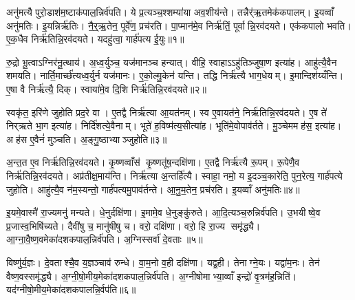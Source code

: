 



\clearpage
{}
\setcounter{anuvakam}{0}
अनु॑मत्यै पुरो॒डाश॑म॒ष्टाक॑पाल॒न्निर्व॑पति। ये प्र॒त्यञ्च॒श्शम्या॑या अव॒शीय॑न्ते। तन्नैर्॑ऋ॒तमेक॑कपालम्। इ॒यव्वाँ अनु॑मतिः। इ॒यन्निर्\mbox{}ऋ॑तिः। नै॒र्॒ऋ॒तेन॒ पूर्वे॑ण॒ प्रच॑रति। पा॒प्मान॑मे॒व निर्\mbox{}ऋ॑तिं॒ पूर्वान्नि॒रव॑दयते। एक॑कपालो भवति। ए॒क॒धैव निर्\mbox{}ऋ॑तिन्नि॒रव॑दयते। यदहु॑त्वा॒ गार्\mbox{}ह॑पत्य ई॒युः॥१॥

रु॒द्रो भू॒त्वाऽग्निर॑नू॒त्थाय॑। अ॒ध्व॒र्युञ्च॒ यज॑मानञ्च हन्यात्। वीहि॒ स्वाहाऽऽहु॑तिञ्जुषा॒ण इत्या॑ह। आहु॑त्यै॒वैन शमयति। नार्ति॒मार्च्छ॑त्यध्व॒र्युर्न यज॑मानः। ए॒को॒ल्मु॒केन॑ यन्ति। तद्धि निर्\mbox{}ऋ॑त्यै भाग॒धेयम्। इ॒मान्दिश॑य्यँन्ति। ए॒षा वै निर्\mbox{}ऋ॑त्यै॒ दिक्। स्वाया॑मे॒व दि॒शि निर्\mbox{}ऋ॑तिन्नि॒रव॑दयते॥२॥

स्वकृ॑त॒ इरि॑णे जुहोति प्रद॒रे वा। ए॒तद्वै निर्\mbox{}ऋ॑त्या आ॒यत॑नम्। स्व ए॒वायत॑ने॒ निर्\mbox{}ऋ॑तिन्नि॒रव॑दयते। ए॒ष ते॑ निर्‌ऋते भा॒ग इत्या॑ह। निर्दि॑शत्ये॒वैनाम्। भूते॑ ह॒विष्म॑त्य॒सीत्या॑ह। भूति॑मे॒वोपाव॑र्तते। मु॒ञ्चेममह॑स॒ इत्या॑ह। अह॑स ए॒वैनं॑ मुञ्चति। अ॒ङ्गु॒ष्ठाभ्याञ्जुहोति॥३॥

अ॒न्त॒त ए॒व निर्\mbox{}ऋ॑तिन्नि॒रव॑दयते। कृ॒ष्णव्वाँस॑ कृ॒ष्णतू॑ष॒न्दक्षि॑णा। ए॒तद्वै निर्\mbox{}ऋ॑त्यै रू॒पम्। रू॒पेणै॒व निर्\mbox{}ऋ॑तिन्नि॒रव॑दयते। अप्र॑तीक्ष॒माय॑न्ति। निर्\mbox{}ऋ॑त्या अ॒न्तर्\mbox{}हि॑त्यै। स्वाहा॒ नमो॒ य इ॒दञ्च॒कारेति॒ पुन॒रेत्य॒ गार्\mbox{}ह॑पत्ये जुहोति। आहु॑त्यै॒व न॑म॒स्यन्तो॒ गार्\mbox{}ह॑पत्यमु॒पाव॑र्तन्ते। आ॒नु॒म॒तेन॒ प्रच॑रति। इ॒यव्वाँ अनु॑मतिः॥४॥

इ॒यमे॒वास्मै॑ रा॒ज्यमनु॑ मन्यते। धे॒नुर्दक्षि॑णा। इ॒मामे॒व धे॒नुङ्कु॑रुते। आ॒दि॒त्यञ्च॒रुन्निर्व॑पति। उ॒भयीष्वे॒व प्र॒जास्व॒भिषि॑च्यते। दैवी॑षु च॒ मानु॑षीषु च। वरो॒ दक्षि॑णा। वरो॒ हि रा॒ज्य समृ॑द्ध्यै। आ॒ग्ना॒वै॒ष्ण॒वमेका॑दशकपाल॒न्निर्व॑पति। अ॒ग्निस्सर्वा॑ दे॒वताः॥५॥

विष्णु॑र्य॒ज्ञः। दे॒वताश्चै॒व य॒ज्ञञ्चाव॑ रुन्धे। वा॒म॒नो व॒ही दक्षि॑णा। यद्व॒ही। तेनाग्ने॒यः। यद्वा॑म॒नः। तेन॑ वैष्ण॒वस्समृ॑द्ध्यै। अ॒ग्नी॒षो॒मीय॒मेका॑दशकपाल॒न्निर्व॑पति। अ॒ग्नीषोमाभ्या॒व्वाँ इन्द्रो॑ वृ॒त्रम॑ह॒न्निति॑। यद॑ग्नीषो॒मीय॒मेका॑दशकपालन्नि॒र्वप॑ति॥६॥

